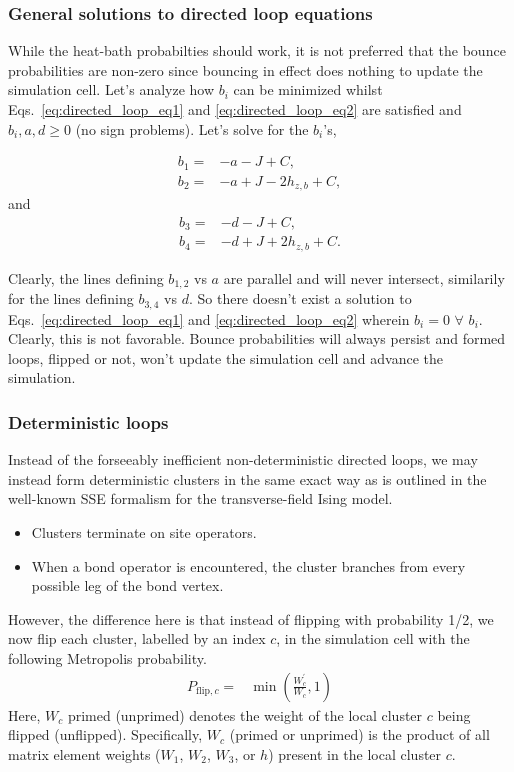 \documentclass[12pt]{article}
\begin{document}
\subsubsection{General solutions to directed loop equations}

While the heat-bath probabilties should work, it is not preferred that the bounce probabilities are non-zero since bouncing in effect does nothing to update the simulation cell.
Let's analyze how $b_i$ can be minimized whilst Eqs.~\ref{eq:directed_loop_eq1} and \ref{eq:directed_loop_eq2} are satisfied and $b_i, a, d \geq 0$ (no sign problems).
Let's solve for the $b_i$'s,

\begin{subequations}
    \begin{align}
        b_1 =& -a - J + C, \\
        b_2 =& -a + J - 2h_{z,b} + C,
    \end{align}
\end{subequations}
and
\begin{subequations}
    \begin{align}
        b_3 =& -d - J + C, \\
        b_4 =& -d + J + 2h_{z,b} + C.
    \end{align}
\end{subequations}

Clearly, the lines defining $b_{1,2}$ vs $a$ are parallel and will never intersect, similarily for the lines defining $b_{3,4}$ vs $d$.
So there doesn't exist a solution to Eqs.~\ref{eq:directed_loop_eq1} and \ref{eq:directed_loop_eq2} wherein $b_i = 0$ $\forall$ $b_i$.
Clearly, this is not favorable. 
Bounce probabilities will always persist and formed loops, flipped or not, won't update the simulation cell and advance the simulation. 

\subsubsection{Deterministic loops}

Instead of the forseeably inefficient non-deterministic directed loops, we may instead form deterministic clusters in the same exact way as is outlined in the well-known SSE formalism for the transverse-field Ising model.
\begin{itemize}
    \item Clusters terminate on site operators.
    \item When a bond operator is encountered, the cluster branches from every possible leg of the bond vertex.
\end{itemize}
However, the difference here is that instead of flipping with probability 1/2, we now flip each cluster, labelled by an index $c$, in the simulation cell with the following Metropolis probability.
\begin{align}
    P_{\text{flip},c} =& \min\left(\frac{W_c^\prime}{W_c}, 1\right)
\end{align}
Here, $W_c$ primed (unprimed) denotes the weight of the local cluster $c$ being flipped (unflipped).
Specifically, $W_c$ (primed or unprimed) is the product of all matrix element weights ($W_1$, $W_2$, $W_3$, or $h$) present in the local cluster $c$. 
\end{document}
